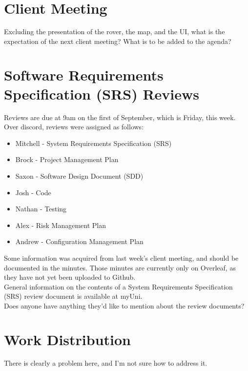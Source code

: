 \documentclass[11pt, a4paper]{article}
\begin{document}
\begin{flushleft}
  \section{Client Meeting}
  Excluding the presentation of the rover, the map, and the UI, what is the expectation of the next client meeting? What is to be added to the agenda?
	
  \section{Software Requirements Specification (SRS) Reviews}
  Reviews are due at 9am on the first of September, which is Friday, this week. \\
  Over discord, reviews were assigned as follows:
  \begin{itemize}
  \item Mitchell - System Requirements Specification (SRS)
  \item Brock - Project Management Plan
  \item Saxon - Software Design Document (SDD)
  \item Josh - Code
  \item Nathan - Testing
  \item Alex - Risk Management Plan
  \item Andrew - Configuration Management Plan
  \end{itemize}
  Some information was acquired from last week's client meeting, and should be documented in the minutes. Those minutes are currently only on Overleaf, as they have not yet been uploaded to Github.\\
  General information on the contents of a System Requirements Specification (SRS) review document is available at myUni.\\
  Does anyone have anything they'd like to mention about the review documents?
  
  \section{Work Distribution}
  There is clearly a problem here, and I'm not sure how to address it.

  \end{flushleft}

  
\end{document}
